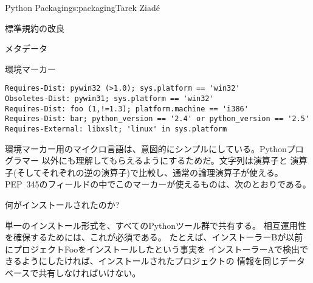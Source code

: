 \begin{aosachapter}{Python Packaging}{s:packaging}{Tarek Ziad\'{e}}
\begin{aosasect1}{標準規約の改良}
\begin{aosasect2}{メタデータ}
\begin{aosasect3}{環境マーカー}
\begin{verbatim}
Requires-Dist: pywin32 (>1.0); sys.platform == 'win32'
Obsoletes-Dist: pywin31; sys.platform == 'win32'
Requires-Dist: foo (1,!=1.3); platform.machine == 'i386'
Requires-Dist: bar; python_version == '2.4' or python_version == '2.5'
Requires-External: libxslt; 'linux' in sys.platform
\end{verbatim}

環境マーカー用のマイクロ言語は、意図的にシンプルにしている。Pythonプログラマー
以外にも理解してもらえるようにするためだ。文字列は\code{==}演算子と
演算子(そしてそれぞれの逆の演算子)で比較し、通常の論理演算子が使える。
PEP~345のフィールドの中でこのマーカーが使えるものは、次のとおりである。

\begin{aosaitemize}
  \item {}
  \item {}
  \item {}
  \item {}
  \item {}
  \item {}
\end{aosaitemize}

\end{aosasect3}

\end{aosasect2}

\begin{aosasect2}{何がインストールされたのか?}

単一のインストール形式を、すべてのPythonツール群で共有する。
相互運用性を確保するためには、これが必須である。
たとえば、インストーラーBが以前にプロジェクトFooをインストールしたという事実を
インストーラーAで検出できるようにしたければ、インストールされたプロジェクトの
情報を同じデータベースで共有しなければいけない。


\end{aosasect2}
\end{aosasect1}
\end{aosachapter}

